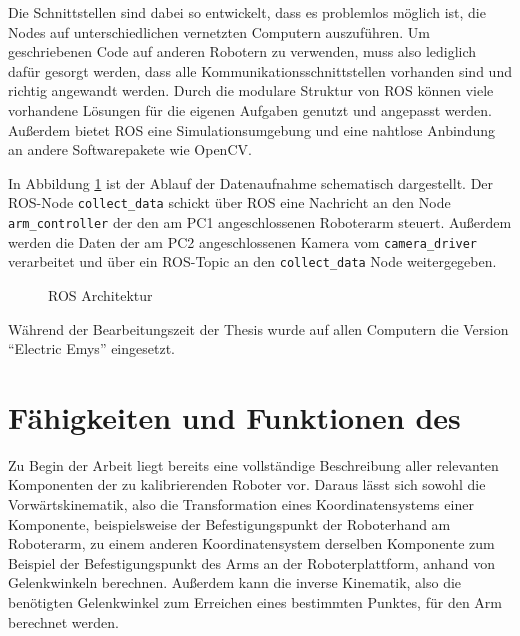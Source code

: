 Die Schnittstellen sind dabei so entwickelt, dass es problemlos möglich ist, die
Nodes auf unterschiedlichen vernetzten Computern auszuführen.  Um geschriebenen
Code auf anderen Robotern zu verwenden, muss also lediglich dafür gesorgt werden, dass
alle Kommunikationsschnittstellen vorhanden sind und richtig angewandt werden.
Durch die modulare Struktur von \ac{ROS} können viele vorhandene Lösungen für
die eigenen Aufgaben genutzt und angepasst werden.  Außerdem bietet \ac{ROS}
eine Simulationsumgebung und eine nahtlose Anbindung an andere Softwarepakete
wie OpenCV.

In Abbildung \ref{fig:ros} ist der Ablauf der Datenaufnahme schematisch dargestellt. Der
\ac{ROS}-Node \allowbreak \texttt{collect\_data} schickt über \ac{ROS} eine Nachricht
an den Node \texttt{arm\_controller} der den am PC1 angeschlossenen 
Roboterarm steuert. Außerdem werden die Daten der am PC2 angeschlossenen Kamera
vom \texttt{camera\_driver} verarbeitet und über ein \ac{ROS}-Topic an den 
\texttt{collect\_data} Node weitergegeben.

\begin{figure}[Htbp]


\label{fig:ros}
\caption{\ac{ROS} Architektur}


\end{figure}


Während der Bearbeitungszeit der Thesis wurde auf allen Computern die Version
``Electric Emys'' eingesetzt.

\section{Fähigkeiten und Funktionen des \protect\cob} %

\label{sec:Fähigkeiten und Funktionen des cob}

Zu Begin der Arbeit liegt bereits eine vollständige Beschreibung aller
relevanten Komponenten der zu kalibrierenden Roboter vor. Daraus lässt sich
sowohl die Vorwärtskinematik, also die Transformation eines Koordinatensystems
einer Komponente, beispielsweise der Befestigungspunkt der Roboterhand am
Roboterarm, zu einem anderen Koordinatensystem derselben Komponente zum
Beispiel der Befestigungspunkt des Arms an der Roboterplattform, anhand von
Gelenkwinkeln berechnen. Außerdem kann die inverse Kinematik, also die
benötigten Gelenkwinkel zum Erreichen eines bestimmten Punktes, für den Arm
berechnet werden.


